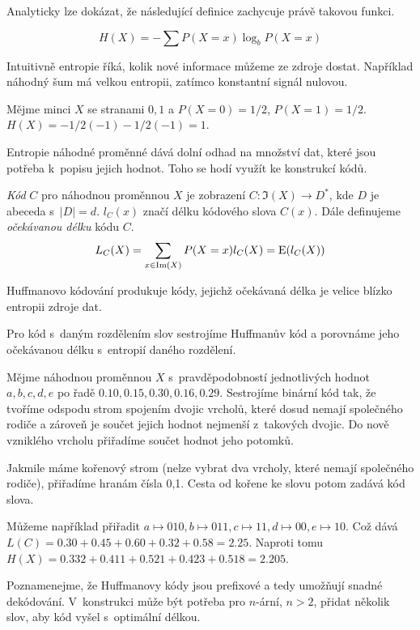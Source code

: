 Analyticky lze dokázat, že následující definice
zachycuje právě takovou funkci.

\pagebreak


\begin{definition}
    \[ H(X) = - \sum P(X = x) \log_b P(X = x) \]
\end{definition}

Intuitivně entropie říká, kolik nové informace můžeme ze zdroje dostat.
Například náhodný šum má velkou entropii, zatímco konstantní signál
nulovou.

\begin{example}
    Mějme minci $X$ se stranami $0,1$ a $P(X = 0) = 1/2$, $P(X = 1) =
    1/2$.
    $H(X) = - 1/2 (-1) - 1/2 (-1) = 1$.
\end{example}

Entropie náhodné proměnné dává dolní odhad na množství dat, které jsou
potřeba k~popisu jejich hodnot. Toho se hodí využít ke konstrukcí kódů.

\begin{definition}
    {\em Kód} $C$ pro náhodnou proměnnou $X$ je zobrazení
    $C : \Im(X) \to D^*$, kde $D$ je abeceda s~$\lvert D \rvert = d$.
    $l_C(x)$ značí délku kódového slova $C(x)$.
    Dále definujeme {\em očekávanou délku} kódu $C$.
    \[
        L_C(X) = \sum_{x \in \Im(X)} P(X = x) l_C(X) = \operatorname{E}(l_C(X))
    \]
\end{definition}

Huffmanovo kódování produkuje kódy, jejichž očekávaná délka je velice
blízko entropii zdroje dat.

\begin{example}
    Pro kód s~daným rozdělením slov sestrojíme Huffmanův kód a porovnáme
    jeho očekávanou délku s~entropií daného rozdělení.

    Mějme náhodnou proměnnou $X$ s~pravděpodobností jednotlivých hodnot
    $a,b,c,d,e$ po řadě
    $0.10,0.15,0.30,0.16,0.29$. Sestrojíme binární kód tak, že
    tvoříme odspodu strom spojením dvojic vrcholů, které dosud nemají
    společného rodiče a zároveň je součet jejich hodnot nejmenší
    z~takových dvojic. Do nově vzniklého vrcholu přiřadíme součet hodnot
    jeho potomků.

    Jakmile máme kořenový strom (nelze vybrat dva vrcholy, které nemají
    společného rodiče), přiřadíme hranám čísla 0,1. Cesta od kořene ke
    slovu potom zadává kód slova.

    Můžeme například přiřadit $a \mapsto 010, b \mapsto 011, c\mapsto
    11, d \mapsto 00, e \mapsto 10$.
    Což dává $L(C) = 0.30+0.45+0.60+0.32+0.58 = 2.25$.
    Naproti tomu $H(X) = 0.332+0.411+0.521+0.423+0.518 = 2.205$.
\end{example}

Poznamenejme, že Huffmanovy kódy jsou prefixové a tedy umožňují snadné
dekódování. V~konstrukci může být potřeba pro $n$-ární, $n > 2$, přidat
několik  slov, aby kód vyšel s~optimální délkou.
